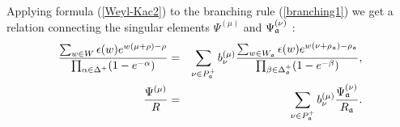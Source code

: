 Applying formula (\ref{Weyl-Kac2}) to the branching rule (\ref{branching1})
we get a relation connecting the singular elements $\Psi ^{\left( \mu
\right) }$ and $\Psi _{\frak{a}}^{\left( \nu \right) }$ :
\begin{eqnarray}
\frac{\sum_{w \in W}\epsilon (w )e^{w (\mu +\rho )-\rho }}{\prod_{\alpha \in
\Delta ^{+}}(1-e^{-\alpha })} &=&\sum_{\nu \in P_{\frak{a}}^{+}}b_{\nu
}^{(\mu )}\frac{\sum_{w \in W_{\frak{a}}}\epsilon (w )e^{w (\nu +\rho _{%
\frak{a}})-\rho _{\frak{a}}}}{\prod_{\beta \in \Delta _{\frak{a}%
}^{+}}(1-e^{-\beta })},  \nonumber  \label{eq:4} \\
\frac{\Psi ^{\left( \mu \right) }}{R} &=&\sum_{\nu \in P_{\frak{a}%
}^{+}}b_{\nu }^{(\mu )}\frac{\Psi _{\frak{a}}^{\left( \nu \right) }}{R_{%
\frak{a}}}.  \label{singular main}
\end{eqnarray}

